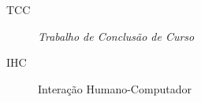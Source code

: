 \begin{description}
	\item[TCC]  \textit{Trabalho de Conclusão de Curso}
	\item[IHC]  Interação Humano-Computador
 
\end{description}
